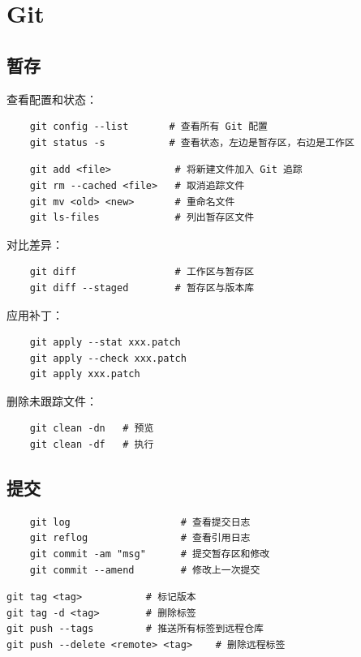 \section{Git}
\subsection{暂存}
查看配置和状态：
\begin{verbatim}
	git config --list       # 查看所有 Git 配置
	git status -s           # 查看状态，左边是暂存区，右边是工作区
\end{verbatim}

\begin{verbatim}
	git add <file>           # 将新建文件加入 Git 追踪
	git rm --cached <file>   # 取消追踪文件
	git mv <old> <new>       # 重命名文件
	git ls-files             # 列出暂存区文件
\end{verbatim}

对比差异：
\begin{verbatim}
	git diff                 # 工作区与暂存区
	git diff --staged        # 暂存区与版本库
\end{verbatim}

应用补丁：
\begin{verbatim}
	git apply --stat xxx.patch
	git apply --check xxx.patch
	git apply xxx.patch
\end{verbatim}

删除未跟踪文件：
\begin{verbatim}
	git clean -dn   # 预览
	git clean -df   # 执行
\end{verbatim}

\subsection{提交}
\begin{verbatim}
	git log                   # 查看提交日志
	git reflog                # 查看引用日志
	git commit -am "msg"      # 提交暂存区和修改
	git commit --amend        # 修改上一次提交
\end{verbatim}

\begin{code}[title=tag]
	\begin{verbatim}
git tag <tag>			# 标记版本
git tag -d <tag>		# 删除标签
git push --tags			# 推送所有标签到远程仓库
git push --delete <remote> <tag>	# 删除远程标签
\end{verbatim}
\end{code}


